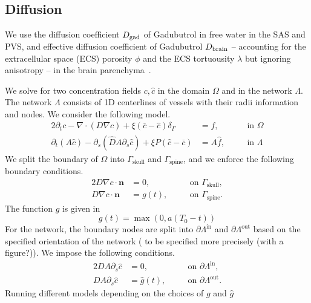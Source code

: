 \documentclass[fleqn,10pt]{wlscirep}
\begin{document}
\subsection*{Diffusion}
We use the diffusion coefficient $D_{\rm gad}$ of Gadubutrol in free water in the SAS and PVS, and effective diffusion coefficient of Gadubutrol $D_{\rm brain}$ -- accounting for the extracellular space (ECS) porosity $\phi$ and the ECS tortuousity $\lambda$ but ignoring anisotropy  -- in the brain parenchyma~\cite{hornkjol2022csf}. 

We solve for two concentration fields $c, \hat c$ in the domain $\Omega$ and in the network $\Lambda$. The 
network $\Lambda$ consists of 1D centerlines of vessels with their radii information and nodes. We consider the following model. 
\begin{alignat}{2}
\partial_t c - \nabla \cdot (D \nabla c ) + \xi (\overline{c} - \hat c ) \delta_\Gamma & = f, && \quad \mathrm{in } \,\, \Omega \\ 
\partial_t (A\hat c) - \partial_s(\hat D A  \partial_s \hat c) + \xi P (\hat c - \overline{c})   & = A \hat f, && \quad \mathrm{in } \,\,  \Lambda 
 \end{alignat}
We split the boundary of $\Omega$ into $\Gamma_{\mathrm{skull}}$ and $\Gamma_{\mathrm{spine}}$,  and we enforce the following boundary conditions. 
\begin{alignat}{2}
D \nabla c \cdot \bm{n} &= 0, && \quad \mathrm{on} \,\, \Gamma_{\mathrm{skull}}, \\ 
D \nabla c \cdot \bm{n} &= g(t),  && \quad \mathrm{on} \,\, \Gamma_{\mathrm{spine}}.
\end{alignat}
The function $g$ is given in 
\begin{equation*}
    g(t) = \max(0, a(T_0 - t))
\end{equation*}
For the network, the boundary nodes are split into $\partial \Lambda^{\mathrm{in}}$  and $\partial \Lambda^{\mathrm{out}}$ based on the specified orientation of the network (\color{blue} to be specified more precisely (with a figure?)\color{black}). We impose the following conditions. 
\begin{alignat}{2}
D A \partial_s \hat c &= 0, && \quad \mathrm{on} \,\, \partial \Lambda^ {\mathrm{in}}, \\ 
D A \partial_s  \hat c &= \hat g(t),  && \quad \mathrm{on} \,\, \partial \Lambda^{\mathrm{out}} .
\end{alignat}
\color{blue} Running different models depending on the choices of $g$ and $\hat g$ \color{black}
\end{document}
